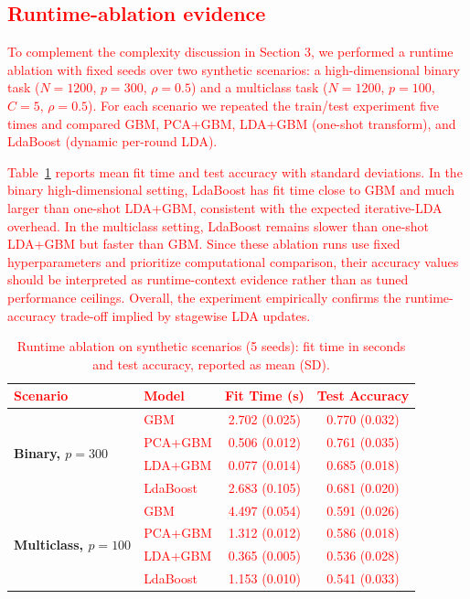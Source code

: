 \documentclass[11pt,a4paper]{article}
\providecommand{\DIFaddtex}[1]{\textcolor{red}{#1}} %
\providecommand{\DIFaddbegin}{} %
\providecommand{\DIFaddFL}[1]{\DIFadd{#1}} %
\providecommand{\DIFadd}[1]{\texorpdfstring{\DIFaddtex{#1}}{#1}} %
\begin{document}
\DIFaddbegin \subsection*{\DIFadd{Runtime-ablation evidence}}
\DIFadd{To complement the complexity discussion in Section 3, we performed a runtime ablation with fixed seeds over two synthetic scenarios: a high-dimensional binary task ($N=1200$, $p=300$, $\rho=0.5$) and a multiclass task ($N=1200$, $p=100$, $C=5$, $\rho=0.5$). For each scenario we repeated the train/test experiment five times and compared GBM, PCA+GBM, LDA+GBM (one-shot transform), and LdaBoost (dynamic per-round LDA).
}

\DIFadd{Table~\ref{tab:runtime_ablation} reports mean fit time and test accuracy with standard deviations. In the binary high-dimensional setting, LdaBoost has fit time close to GBM and much larger than one-shot LDA+GBM, consistent with the expected iterative-LDA overhead. In the multiclass setting, LdaBoost remains slower than one-shot LDA+GBM but faster than GBM. Since these ablation runs use fixed hyperparameters and prioritize computational comparison, their accuracy values should be interpreted as runtime-context evidence rather than as tuned performance ceilings. Overall, the experiment empirically confirms the runtime-accuracy trade-off implied by stagewise LDA updates.
}

\begin{table}[h!]
\centering
\begingroup
\setlength{\tabcolsep}{4.5pt}
\renewcommand{\arraystretch}{1.0}
\footnotesize
\caption{\DIFaddFL{Runtime ablation on synthetic scenarios (5 seeds): fit time in seconds and test accuracy, reported as mean (SD).}}
\label{tab:runtime_ablation}
\begin{tabular}{@{}llcc@{}}
\toprule
\DIFaddFL{\textbf{Scenario} }& \DIFaddFL{\textbf{Model} }& \DIFaddFL{\textbf{Fit Time (s)} }& \DIFaddFL{\textbf{Test Accuracy} }\\
\midrule
\multirow{4}{*}{\textbf{Binary, $p=300$}}
    & \DIFaddFL{GBM      }& \DIFaddFL{2.702 (0.025) }& \DIFaddFL{0.770 (0.032) }\\
    & \DIFaddFL{PCA+GBM  }& \DIFaddFL{0.506 (0.012) }& \DIFaddFL{0.761 (0.035) }\\
    & \DIFaddFL{LDA+GBM  }& \DIFaddFL{0.077 (0.014) }& \DIFaddFL{0.685 (0.018) }\\
    & \DIFaddFL{LdaBoost }& \DIFaddFL{2.683 (0.105) }& \DIFaddFL{0.681 (0.020) }\\
\midrule
\multirow{4}{*}{\textbf{Multiclass, $p=100$}}
    & \DIFaddFL{GBM      }& \DIFaddFL{4.497 (0.054) }& \DIFaddFL{0.591 (0.026) }\\
    & \DIFaddFL{PCA+GBM  }& \DIFaddFL{1.312 (0.012) }& \DIFaddFL{0.586 (0.018) }\\
    & \DIFaddFL{LDA+GBM  }& \DIFaddFL{0.365 (0.005) }& \DIFaddFL{0.536 (0.028) }\\
    & \DIFaddFL{LdaBoost }& \DIFaddFL{1.153 (0.010) }& \DIFaddFL{0.541 (0.033) }\\
\bottomrule
\end{tabular}
\endgroup
\end{table}
\end{document}
